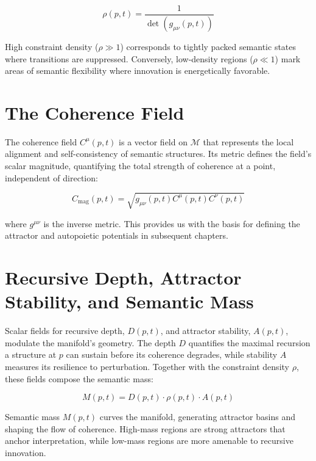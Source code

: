 \begin{equation}
\rho(p, t) = \frac{1}{\det(g_{\mu\nu}(p, t))}
\end{equation}

High constraint density (\(\rho \gg 1\)) corresponds to tightly packed semantic states where transitions are suppressed. Conversely, low-density regions (\(\rho \ll 1\)) mark areas of semantic flexibility where innovation is energetically favorable.


\section{The Coherence Field}
\label{3.5:the_coherence_field}

The coherence field \(C^\mu(p, t)\) is a vector field on \(\mathcal{M}\) that represents the local alignment and self-consistency of semantic structures. Its metric defines the field's scalar magnitude, quantifying the total strength of coherence at a point, independent of direction:

\begin{equation}
C_{\mathrm{mag}}(p, t) = \sqrt{g_{\mu\nu}(p, t) C^\mu(p, t) C^\nu(p, t)}
\end{equation}

where \(g^{\mu\nu}\) is the inverse metric. This provides us with the basis for defining the attractor and autopoietic potentials in subsequent chapters.


\section{Recursive Depth, Attractor Stability, and Semantic Mass}
\label{3.6:recursive_depth_attractor_stability_and_semantic_mass}

Scalar fields for recursive depth, \(D(p, t)\), and attractor stability, \(A(p, t)\), modulate the manifold's geometry. The depth \(D\) quantifies the maximal recursion a structure at \(p\) can sustain before its coherence degrades, while stability \(A\) measures its resilience to perturbation. Together with the constraint density \(\rho\), these fields compose the semantic mass:

\begin{equation}
M(p, t) = D(p, t) \cdot \rho(p, t) \cdot A(p, t)
\end{equation}

Semantic mass \(M(p,t)\) curves the manifold, generating attractor basins and shaping the flow of coherence. High-mass regions are strong attractors that anchor interpretation, while low-mass regions are more amenable to recursive innovation. 